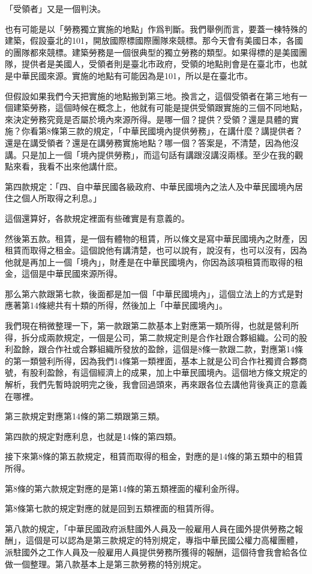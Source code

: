 \documentclass[]{ctexbook}
\begin{document}
「受領者」又是一個判決。

也有可能是以「勞務獨立實施的地點」作爲判斷。我們舉例而言，要蓋一棟特殊的建築，假設臺北的101，開放國際標國際團隊來競標。那今天會有美國日本，各國的團隊都來競標。建築勞務是一個很典型的獨立勞務的類型。如果得標的是美國團隊，提供者是美國人，受領者則是臺北市政府，受領的地點則會是在臺北市，也就是中華民國來源。實施的地點有可能因為是101，所以是在臺北市。

但假設如果我們今天把實施的地點搬到第三地。換言之，這個受領者在第三地有一個建築勞務，這個時候在概念上，他就有可能是提供受領跟實施的三個不同地點，來決定勞務究竟是否屬於境內來源所得。是哪一個？提供？受領？還是具體的實施？你看第8條第三款的規定，「中華民國境內提供勞務」，在講什麼？講提供者？還是在講受領者？還是在講勞務實施地點？哪一個？答案是，不清楚，因為他沒講。只是加上一個「境內提供勞務」，而這句話有講跟沒講沒兩樣。至少在我的觀點來看，我看不出來他講什麽。

第四款規定：「四、自中華民國各級政府、中華民國境內之法人及中華民國境內居住之個人所取得之利息。」

這個還算好，各款規定裡面有些確實是有意義的。

然後第五款。租賃，是一個有體物的租賃，所以條文是寫中華民國境內之財產，因租賃而取得之租金。這個說他有講清楚，也可以說有，說沒有，也可以沒有，因為他就是再加上一個「境內」，財產是在中華民國境內，你因為該項租賃而取得的租金，這個是中華民國來源所得。

那么第六款跟第七款，後面都是加一個「中華民國境內」，這個立法上的方式是對應著第14條總共有十類的所得，然後加上「中華民國境內」。

我們現在稍微整理一下，第一款跟第二款基本上對應第一類所得，也就是營利所得，拆分成兩款規定，一個是公司，第二款規定則是合作社跟合夥組織。公司的股利盈餘，跟合作社或合夥組織所發放的盈餘，這個是8條一款跟二款，對應第14條的第一類營利所得，因為我們14條第一類裡面，基本上就是公司合作社獨資合夥商號，有股利盈餘，有這個經濟上的成果，加上中華民國境內。這個地方條文規定的解析，我們先暫時說明完之後，我會回過頭來，再來跟各位去講他背後真正的意義在哪裡。

第三款規定對應第14條的第二類跟第三類。

第四款的規定對應利息，也就是14條的第四類。

接下來第8條的第五款規定，租賃而取得的租金，對應的是14條的第五類中的租賃所得。

第8條的第六款規定對應的是第14條的第五類裡面的權利金所得。

第8條第七款的規定對應的就是回到五類裡面的租賃所得。

第八款的規定，「中華民國政府派駐國外人員及一般雇用人員在國外提供勞務之報酬」，這個是可以認為是第三款規定的特別規定，專指中華民國公權力高權團體，派駐國外之工作人員及一般雇用人員提供勞務所獲得的報酬，這個待會我會給各位做一個整理。第八款基本上是第三款勞務的特別規定。
\end{document}
